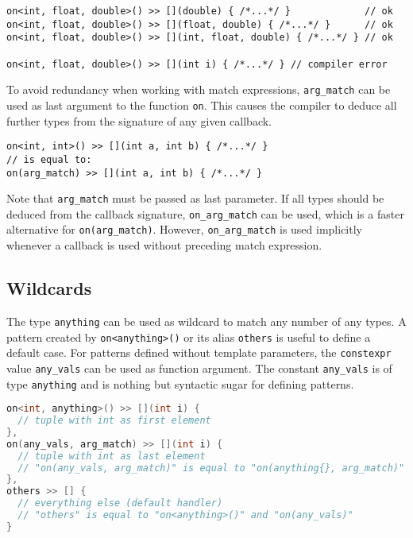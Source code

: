 \begin{lstlisting}
on<int, float, double>() >> [](double) { /*...*/ }             // ok
on<int, float, double>() >> [](float, double) { /*...*/ }      // ok
on<int, float, double>() >> [](int, float, double) { /*...*/ } // ok

on<int, float, double>() >> [](int i) { /*...*/ } // compiler error
\end{lstlisting}

To avoid redundancy when working with match expressions, \lstinline^arg_match^ can be used as last argument to the function \lstinline^on^.
This causes the compiler to deduce all further types from the signature of any given callback.

\begin{lstlisting}
on<int, int>() >> [](int a, int b) { /*...*/ }
// is equal to:
on(arg_match) >> [](int a, int b) { /*...*/ }
\end{lstlisting}

Note that \lstinline^arg_match^ must be passed as last parameter.
If all types should be deduced from the callback signature, \lstinline^on_arg_match^ can be used, which is a faster alternative for \lstinline^on(arg_match)^.
However, \lstinline^on_arg_match^ is used implicitly whenever a callback is used without preceding match expression.

\subsection{Wildcards}
\label{Sec::PatternMatching::Wildcards}

The type \lstinline^anything^ can be used as wildcard to match any number of any types.
A pattern created by \lstinline^on<anything>()^ or its alias \lstinline^others^ is useful to define a default case.
For patterns defined without template parameters, the \lstinline^constexpr^ value \lstinline^any_vals^ can be used as function argument.
The constant \lstinline^any_vals^ is of type \lstinline^anything^ and is nothing but syntactic sugar for defining patterns.

\begin{lstlisting}[language=C++]
on<int, anything>() >> [](int i) {
  // tuple with int as first element
},
on(any_vals, arg_match) >> [](int i) {
  // tuple with int as last element
  // "on(any_vals, arg_match)" is equal to "on(anything{}, arg_match)"
},
others >> [] {
  // everything else (default handler)
  // "others" is equal to "on<anything>()" and "on(any_vals)"
}
\end{lstlisting}


